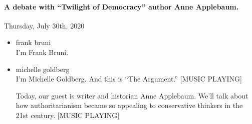 \hypertarget{a-debate-with-twilight-of-democracy-author-anne-applebaum-2}{%
\paragraph{A debate with ``Twilight of Democracy'' author Anne
Applebaum.}\label{a-debate-with-twilight-of-democracy-author-anne-applebaum-2}}

Thursday, July 30th, 2020

\begin{itemize}
\item
  frank bruni\\
  I'm Frank Bruni.
\item
  michelle goldberg\\
  I'm Michelle Goldberg. And this is ``The Argument.'' {[}MUSIC
  PLAYING{]}

  Today, our guest is writer and historian Anne Applebaum. We'll talk
  about how authoritarianism became so appealing to conservative
  thinkers in the 21st century. {[}MUSIC PLAYING{]}


\end{itemize}
